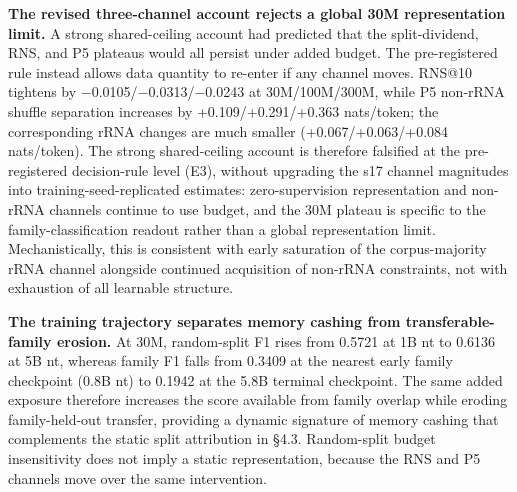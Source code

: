 \textbf{The revised three-channel account rejects a global 30M representation limit.} A strong shared-ceiling account had predicted that the split-dividend, RNS, and P5 plateaus would all persist under added budget. The pre-registered rule instead allows data quantity to re-enter if any channel moves. RNS@10 tightens by \(-\)0.0105/\(-\)0.0313/\(-\)0.0243 at 30M/100M/300M, while P5 non-rRNA shuffle separation increases by +0.109/+0.291/+0.363 nats/token; the corresponding rRNA changes are much smaller (+0.067/+0.063/+0.084 nats/token). The strong shared-ceiling account is therefore falsified at the pre-registered decision-rule level (E3), without upgrading the s17 channel magnitudes into training-seed-replicated estimates: zero-supervision representation and non-rRNA channels continue to use budget, and the 30M plateau is specific to the family-classification readout rather than a global representation limit. Mechanistically, this is consistent with early saturation of the corpus-majority rRNA channel alongside continued acquisition of non-rRNA constraints, not with exhaustion of all learnable structure.

\textbf{The training trajectory separates memory cashing from transferable-family erosion.} At 30M, random-split F1 rises from 0.5721 at 1B nt to 0.6136 at 5B nt, whereas family F1 falls from 0.3409 at the nearest early family checkpoint (0.8B nt) to 0.1942 at the 5.8B terminal checkpoint. The same added exposure therefore increases the score available from family overlap while eroding family-held-out transfer, providing a dynamic signature of memory cashing that complements the static split attribution in \S4.3. Random-split budget insensitivity does not imply a static representation, because the RNS and P5 channels move over the same intervention.


